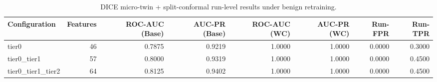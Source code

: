 \begin{table}[t]
\centering
\caption{DICE micro-twin + split-conformal run-level results under benign retraining.}
\label{tab:dice_full_overall}
\footnotesize
\begin{tabular}{lrrrrrrr}
\toprule
Configuration & Features & ROC-AUC (Base) & AUC-PR (Base) & ROC-AUC (WC) & AUC-PR (WC) & Run-FPR & Run-TPR \\
\midrule
tier0 & 46 & 0.7875 & 0.9219 & 1.0000 & 1.0000 & 0.0000 & 0.3000 \\
tier0_tier1 & 57 & 0.8000 & 0.9319 & 1.0000 & 1.0000 & 0.0000 & 0.4500 \\
tier0_tier1_tier2 & 64 & 0.8125 & 0.9402 & 1.0000 & 1.0000 & 0.0000 & 0.4500 \\
\bottomrule
\end{tabular}

\end{table}
